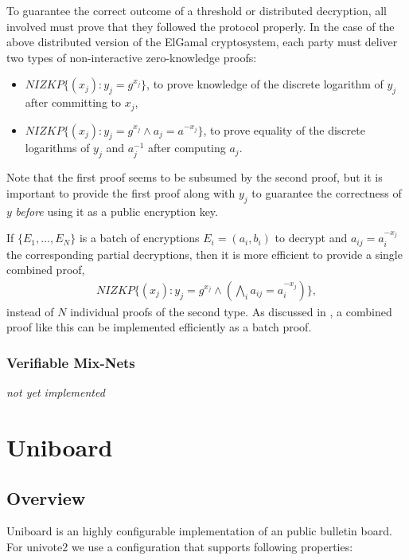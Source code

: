 \documentclass[bibtotoc,halfparskip,oneside]{scrreprt}
\begin{document}
To guarantee the correct outcome of a threshold or distributed decryption, all involved must prove that they followed the protocol properly. In the case of the above distributed version of the ElGamal cryptosystem, each party must deliver two types of non-interactive zero-knowledge proofs:
\begin{itemize}
\item $\mathit{NIZKP}\{(x_j):y_j=g^{x_j}\}$, to prove knowledge of the discrete logarithm of $y_j$ after committing to $x_j$,
\item $\mathit{NIZKP}\{(x_j):y_j=g^{x_j} \wedge a_j=a^{-x_j}\}$, to prove equality of the discrete logarithms of $y_j$ and $a_j^{-1}$ after computing $a_j$.
\end{itemize}
Note that the first proof seems to be subsumed by the second proof, but it is important to provide the first proof along with $y_j$ to guarantee the correctness of $y$ \emph{before} using it as a public encryption key.

If $\{E_1,\ldots,E_N\}$ is a batch of encryptions $E_i=(a_i,b_i)$ to decrypt and $a_{ij}=a_i^{-x_j}$ the corresponding partial decryptions, then it is more efficient to provide a single combined  proof,
\begin{align}
\mathit{NIZKP}\{(x_j):y_j=g^{x_j} \wedge (\bigwedge_i a_{ij}=a_i^{-x_j})\},
\end{align}
instead of $N$ individual proofs of the second type. As discussed in , a combined proof like this can be implemented efficiently as a batch proof.

\subsection{Verifiable Mix-Nets}

\emph{not yet implemented}
\chapter{Uniboard}

\section{Overview}
Uniboard is an highly configurable implementation of an public bulletin board. For univote2 we use
a configuration that supports following properties:
\end{document}

